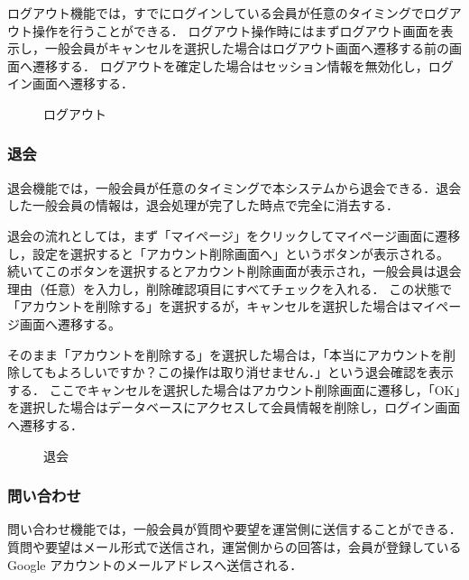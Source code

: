 ログアウト機能では，すでにログインしている会員が任意のタイミングでログアウト操作を行うことができる．
ログアウト操作時にはまずログアウト画面を表示し，一般会員がキャンセルを選択した場合はログアウト画面へ遷移する前の画面へ遷移する．
ログアウトを確定した場合はセッション情報を無効化し，ログイン画面へ遷移する．


\begin{figure}[H]
    \centering
    
    \caption{ログアウト}
\end{figure}


\subsubsection{退会}
退会機能では，一般会員が任意のタイミングで本システムから退会できる．退会した一般会員の情報は，退会処理が完了した時点で完全に消去する．


退会の流れとしては，まず「マイページ」をクリックしてマイページ画面に遷移し，設定を選択すると「アカウント削除画面へ」というボタンが表示される。
続いてこのボタンを選択するとアカウント削除画面が表示され，一般会員は退会理由（任意）を入力し，削除確認項目にすべてチェックを入れる．
この状態で「アカウントを削除する」を選択するが，キャンセルを選択した場合はマイページ画面へ遷移する。

そのまま「アカウントを削除する」を選択した場合は，「本当にアカウントを削除してもよろしいですか？この操作は取り消せません．」という退会確認を表示する．
ここでキャンセルを選択した場合はアカウント削除画面に遷移し，「OK」を選択した場合はデータベースにアクセスして会員情報を削除し，ログイン画面へ遷移する．



\begin{figure}[H]
    \centering
    

    \caption{退会}
\end{figure}

\subsubsection{問い合わせ}
問い合わせ機能では，一般会員が質問や要望を運営側に送信することができる．
質問や要望はメール形式で送信され，運営側からの回答は，会員が登録している Google アカウントのメールアドレスへ送信される．


